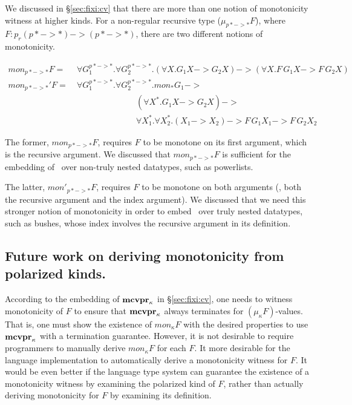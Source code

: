 We discussed in \S\ref{sec:fixi:cv} that there are more than one notion of
monotonicity witness at higher kinds. For a non-regular recursive type
($\mu_{p* -> *} F$), where $F : p_r(p* -> *) -> (p* -> *)$, there are
two different notions of monotonicity.\vspace*{-1.5em}
\begin{singlespace}
\begin{align*}
\textit{mon}_{p* -> *}F =~&
	\forall G_1^{p* -> *}.\forall G_2^{p* -> *}.
	(\forall X. G_1 X -> G_2 X) -> (\forall X.F\,G_1 X -> F\,G_2 X)
	\\[1mm]
\textit{mon}_{p* -> *}'F =~&
	\forall G_1^{p* -> *}.\forall G_2^{p* -> *}.
		mon_{*} G_1 -> \\ & \qquad\qquad\qquad\quad
		(\forall X^{*}. G_1 X -> G_2 X) -> \\ & \qquad\qquad\qquad\quad
		\forall X_1^{*}.\forall X_2^{*}.
		(X_1 -> X_2) -> F\,G_1 X_1 -> F\,G_2 X_2
\end{align*}
\end{singlespace}
The former, $\textit{mon}_{p* -> *}F$, requires $F$ to be monotone
on its first argument, which is the recursive argument.
We discussed that $\textit{mon}_{p* -> *}F$ is sufficient
for the embedding of \McvPr\ over non-truly nested datatypes,
such as powerlists.

The latter, $\textit{mon}'_{p* -> *}F$, requires $F$ to be monotone
on both arguments (\ie, both the recursive argument and the index argument).
We discussed that we need this stronger notion of monotonicity
in order to embed \McvPr\ over truly nested datatypes, such as bushes,
whose index involves the recursive argument in its definition.

\subsection*{Future work on deriving monotonicity from polarized kinds.}
According to the embedding of $\mathbf{mcvpr}_\kappa$ in \S\ref{sec:fixi:cv},
one needs to witness monotonicity of $F$ to ensure that $\mathbf{mcvpr}_\kappa$
always terminates for $(\mu_\kappa F)$-values. That is, one must show
the existence of $mon_{\kappa}F$ with the desired properties to use
$\mathbf{mcvpr}_\kappa$ with a termination guarantee. However, it is not desirable
to require programmers to manually derive $mon_{\kappa}F$ for each $F$.
It more desirable for the language implementation to automatically
derive a monotonicity witness for $F$. It would be even better if
the language type system can guarantee the existence of a monotonicity witness
by examining the polarized kind of $F$, rather than actually deriving
monotonicity for $F$ by examining its definition.


